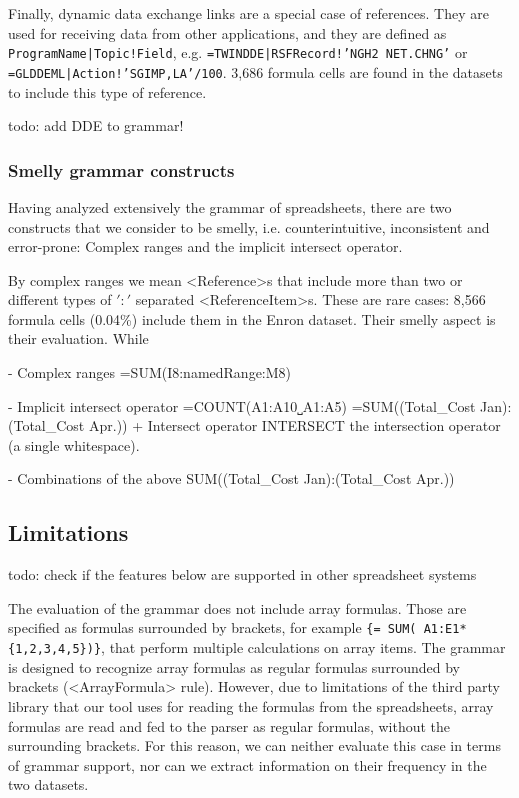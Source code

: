 \documentclass[conference]{IEEEtran}
\begin{document}
Finally, dynamic data exchange links are a special case of references. They are used for receiving data from other applications, and they are defined as \texttt{ProgramName|Topic!Field}, e.g. \texttt{=TWINDDE|RSFRecord!'NGH2 NET.CHNG'} or \texttt{=GLDDEML|Action!'SGIMP,LA'/100}. 3,686 formula cells are found in the datasets to include this type of reference.

todo: add DDE to grammar!
 
\subsubsection{Smelly grammar constructs}
Having analyzed extensively the grammar of spreadsheets, there are two constructs that we consider to be smelly, i.e. counterintuitive, inconsistent and error-prone: Complex ranges and the implicit intersect operator.

By complex ranges we mean <Reference>s that include more than two or different types of $':'$ separated <ReferenceItem>s. These are rare cases: 8,566 formula cells	(0.04\%) include them in the Enron dataset. Their smelly aspect is their evaluation. While 

- Complex ranges =SUM(I8:namedRange:M8)

- Implicit intersect operator =COUNT(A1:A10˽A1:A5) =SUM((Total_Cost Jan):(Total_Cost Apr.))
+ Intersect operator INTERSECT  the intersection operator \texttt{} (a single whitespace).

- Combinations of the above SUM((Total\_Cost Jan):(Total\_Cost Apr.))


\subsection{Limitations}
todo: check if the features below are supported in other spreadsheet systems

The evaluation of the grammar does not include array formulas. Those are specified as formulas surrounded by brackets, for example \texttt{\{= SUM( A1:E1*\{1,2,3,4,5\})\}}, that perform multiple calculations on array items. The grammar is designed to recognize array formulas as regular formulas surrounded by brackets (<ArrayFormula> rule). However, due to limitations of the third party library that our tool uses for reading the formulas from the spreadsheets, array formulas are read and fed to the parser as regular formulas, without the surrounding brackets. For this reason, we can neither evaluate this case in terms of grammar support, nor can we extract information on their frequency in the two datasets.
\end{document}
